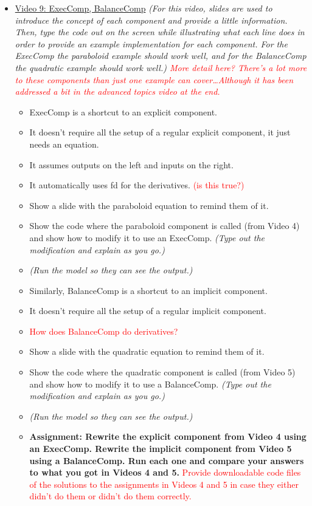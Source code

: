 \documentclass[12pt, letterpaper]{article}
\begin{document}
\begin{itemize}
	\item \underline{Video 9: ExecComp, BalanceComp} \textit{(For this video, slides are used to introduce the concept of each component and provide a little information. Then, type the code out on the screen while illustrating what each line does in order to provide an example implementation for each component. For the ExecComp the paraboloid example should work well, and for the BalanceComp the quadratic example should work well.) \textcolor{red}{More detail here? There’s a lot more to these components than just one example can cover…Although it has been addressed a bit in the advanced topics video at the end.}}
		\begin{itemize}
			\item ExecComp is a shortcut to an explicit component. 
			\item It doesn’t require all the setup of a regular explicit component, it just needs an equation.
			\item It assumes outputs on the left and inputs on the right. 
			\item It automatically uses fd for the derivatives. \textcolor{red}{(is this true?)}
			\item Show a slide with the paraboloid equation to remind them of it.
			\item Show the code where the paraboloid component is called (from Video 4) and show how to modify it to use an ExecComp. \textit{(Type out the modification and explain as you go.)}
			\item \textit{(Run the model so they can see the output.)}
			\item Similarly, BalanceComp is a shortcut to an implicit component.
			\item It doesn’t require all the setup of a regular implicit component.
			\item \textcolor{red}{How does BalanceComp do derivatives?}
			\item Show a slide with the quadratic equation to remind them of it.
			\item Show the code where the quadratic component is called (from Video 5) and show how to modify it to use a BalanceComp. \textit{(Type out the modification and explain as you go.)}
			\item \textit{(Run the model so they can see the output.)}
			\item \textbf{Assignment: Rewrite the explicit component from Video 4 using an ExecComp. Rewrite the implicit component from Video 5 using a BalanceComp. Run each one and compare your answers to what you got in Videos 4 and 5.} \textcolor{red}{Provide downloadable code files of the solutions to the assignments in Videos 4 and 5 in case they either didn't do them or didn't do them correctly.}
		\end{itemize}


\end{itemize}
\end{document}
